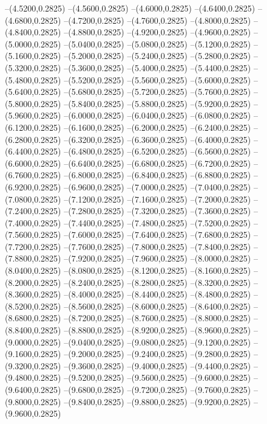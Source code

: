 {	--(4.5200,0.2825)
	--(4.5600,0.2825)
	--(4.6000,0.2825)
	--(4.6400,0.2825)
	--(4.6800,0.2825)
	--(4.7200,0.2825)
	--(4.7600,0.2825)
	--(4.8000,0.2825)
	--(4.8400,0.2825)
	--(4.8800,0.2825)
	--(4.9200,0.2825)
	--(4.9600,0.2825)
	--(5.0000,0.2825)
	--(5.0400,0.2825)
	--(5.0800,0.2825)
	--(5.1200,0.2825)
	--(5.1600,0.2825)
	--(5.2000,0.2825)
	--(5.2400,0.2825)
	--(5.2800,0.2825)
	--(5.3200,0.2825)
	--(5.3600,0.2825)
	--(5.4000,0.2825)
	--(5.4400,0.2825)
	--(5.4800,0.2825)
	--(5.5200,0.2825)
	--(5.5600,0.2825)
	--(5.6000,0.2825)
	--(5.6400,0.2825)
	--(5.6800,0.2825)
	--(5.7200,0.2825)
	--(5.7600,0.2825)
	--(5.8000,0.2825)
	--(5.8400,0.2825)
	--(5.8800,0.2825)
	--(5.9200,0.2825)
	--(5.9600,0.2825)
	--(6.0000,0.2825)
	--(6.0400,0.2825)
	--(6.0800,0.2825)
	--(6.1200,0.2825)
	--(6.1600,0.2825)
	--(6.2000,0.2825)
	--(6.2400,0.2825)
	--(6.2800,0.2825)
	--(6.3200,0.2825)
	--(6.3600,0.2825)
	--(6.4000,0.2825)
	--(6.4400,0.2825)
	--(6.4800,0.2825)
	--(6.5200,0.2825)
	--(6.5600,0.2825)
	--(6.6000,0.2825)
	--(6.6400,0.2825)
	--(6.6800,0.2825)
	--(6.7200,0.2825)
	--(6.7600,0.2825)
	--(6.8000,0.2825)
	--(6.8400,0.2825)
	--(6.8800,0.2825)
	--(6.9200,0.2825)
	--(6.9600,0.2825)
	--(7.0000,0.2825)
	--(7.0400,0.2825)
	--(7.0800,0.2825)
	--(7.1200,0.2825)
	--(7.1600,0.2825)
	--(7.2000,0.2825)
	--(7.2400,0.2825)
	--(7.2800,0.2825)
	--(7.3200,0.2825)
	--(7.3600,0.2825)
	--(7.4000,0.2825)
	--(7.4400,0.2825)
	--(7.4800,0.2825)
	--(7.5200,0.2825)
	--(7.5600,0.2825)
	--(7.6000,0.2825)
	--(7.6400,0.2825)
	--(7.6800,0.2825)
	--(7.7200,0.2825)
	--(7.7600,0.2825)
	--(7.8000,0.2825)
	--(7.8400,0.2825)
	--(7.8800,0.2825)
	--(7.9200,0.2825)
	--(7.9600,0.2825)
	--(8.0000,0.2825)
	--(8.0400,0.2825)
	--(8.0800,0.2825)
	--(8.1200,0.2825)
	--(8.1600,0.2825)
	--(8.2000,0.2825)
	--(8.2400,0.2825)
	--(8.2800,0.2825)
	--(8.3200,0.2825)
	--(8.3600,0.2825)
	--(8.4000,0.2825)
	--(8.4400,0.2825)
	--(8.4800,0.2825)
	--(8.5200,0.2825)
	--(8.5600,0.2825)
	--(8.6000,0.2825)
	--(8.6400,0.2825)
	--(8.6800,0.2825)
	--(8.7200,0.2825)
	--(8.7600,0.2825)
	--(8.8000,0.2825)
	--(8.8400,0.2825)
	--(8.8800,0.2825)
	--(8.9200,0.2825)
	--(8.9600,0.2825)
	--(9.0000,0.2825)
	--(9.0400,0.2825)
	--(9.0800,0.2825)
	--(9.1200,0.2825)
	--(9.1600,0.2825)
	--(9.2000,0.2825)
	--(9.2400,0.2825)
	--(9.2800,0.2825)
	--(9.3200,0.2825)
	--(9.3600,0.2825)
	--(9.4000,0.2825)
	--(9.4400,0.2825)
	--(9.4800,0.2825)
	--(9.5200,0.2825)
	--(9.5600,0.2825)
	--(9.6000,0.2825)
	--(9.6400,0.2825)
	--(9.6800,0.2825)
	--(9.7200,0.2825)
	--(9.7600,0.2825)
	--(9.8000,0.2825)
	--(9.8400,0.2825)
	--(9.8800,0.2825)
	--(9.9200,0.2825)
	--(9.9600,0.2825)
}
